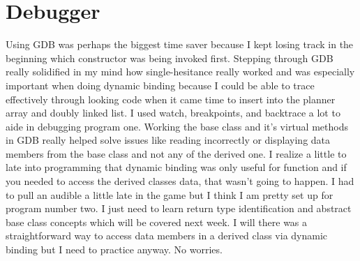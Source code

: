 \documentclass[11pt, a4paper]{article}
\begin{document}
\section*{Debugger}
Using GDB was perhaps the biggest time saver because I kept losing track in the beginning which constructor was being invoked first. Stepping through GDB really solidified in my mind how single-hesitance really worked and was especially important when doing dynamic binding because I could be able to trace effectively through looking code when it came time to insert into the planner array and doubly linked list. I used watch, breakpoints, and backtrace a lot to aide in debugging program one. Working the base class and it's virtual methods in GDB really helped solve issues like reading incorrectly or displaying data members from the base class and not any of the derived one. I realize a little to late into programming that dynamic binding was only useful for function and if you needed to access the derived classes data, that wasn't going to happen. I had to pull an audible a little late in the game but I think I am pretty set up for program number two. I just need to learn return type identification and abstract base class concepts which will be covered next week. I will there was a straightforward way to access data members in a derived class via dynamic binding but I need to practice anyway. No worries.
\end{document}
